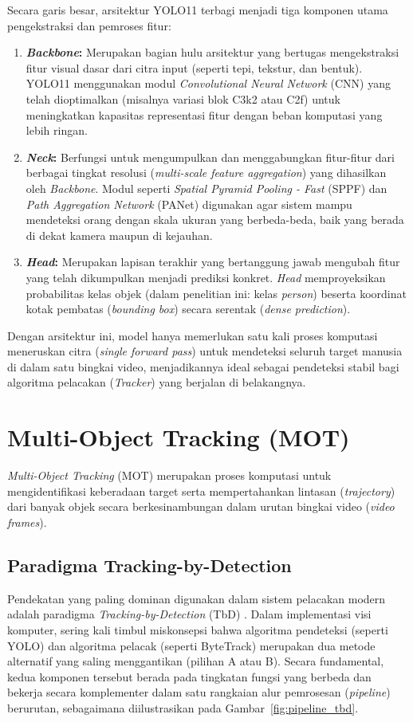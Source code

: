 Secara garis besar, arsitektur YOLO11 terbagi menjadi tiga komponen utama pengekstraksi dan pemroses fitur:
\begin{enumerate}
    \item \textbf{\textit{Backbone}:} Merupakan bagian hulu arsitektur yang bertugas mengekstraksi fitur visual dasar dari citra input (seperti tepi, tekstur, dan bentuk). YOLO11 menggunakan modul \textit{Convolutional Neural Network} (CNN) yang telah dioptimalkan (misalnya variasi blok C3k2 atau C2f) untuk meningkatkan kapasitas representasi fitur dengan beban komputasi yang lebih ringan.
    \item \textbf{\textit{Neck}:} Berfungsi untuk mengumpulkan dan menggabungkan fitur-fitur dari berbagai tingkat resolusi (\textit{multi-scale feature aggregation}) yang dihasilkan oleh \textit{Backbone}. Modul seperti \textit{Spatial Pyramid Pooling - Fast} (SPPF) dan \textit{Path Aggregation Network} (PANet) digunakan agar sistem mampu mendeteksi orang dengan skala ukuran yang berbeda-beda, baik yang berada di dekat kamera maupun di kejauhan.
    \item \textbf{\textit{Head}:} Merupakan lapisan terakhir yang bertanggung jawab mengubah fitur yang telah dikumpulkan menjadi prediksi konkret. \textit{Head} memproyeksikan probabilitas kelas objek (dalam penelitian ini: kelas \textit{person}) beserta koordinat kotak pembatas (\textit{bounding box}) secara serentak (\textit{dense prediction}).
\end{enumerate}

Dengan arsitektur ini, model hanya memerlukan satu kali proses komputasi meneruskan citra (\textit{single forward pass}) untuk mendeteksi seluruh target manusia di dalam satu bingkai video, menjadikannya ideal sebagai pendeteksi stabil bagi algoritma pelacakan (\textit{Tracker}) yang berjalan di belakangnya.

\section{Multi-Object Tracking (MOT)}

\textit{Multi-Object Tracking} (MOT) merupakan proses komputasi untuk mengidentifikasi keberadaan target serta mempertahankan lintasan (\textit{trajectory}) dari banyak objek secara berkesinambungan dalam urutan bingkai video (\textit{video frames}).

\subsection{Paradigma Tracking-by-Detection}
Pendekatan yang paling dominan digunakan dalam sistem pelacakan modern adalah paradigma \textit{Tracking-by-Detection} (TbD) \cite{panagos2026}. Dalam implementasi visi komputer, sering kali timbul miskonsepsi bahwa algoritma pendeteksi (seperti YOLO) dan algoritma pelacak (seperti ByteTrack) merupakan dua metode alternatif yang saling menggantikan (pilihan A atau B). Secara fundamental, kedua komponen tersebut berada pada tingkatan fungsi yang berbeda dan bekerja secara komplementer dalam satu rangkaian alur pemrosesan (\textit{pipeline}) berurutan, sebagaimana diilustrasikan pada Gambar~\ref{fig:pipeline_tbd}.

